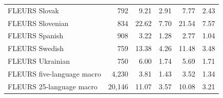 \begin{table}[!ht]
\begin{tabular}{lrrrrr}
FLEURS Slovak & 792 & 9.21 & 2.91 & 7.77 & 2.43\\
FLEURS Slovenian & 834 & 22.62 & 7.70 & 21.54 & 7.57\\
FLEURS Spanish & 908 & 3.22 & 1.28 & 2.77 & 1.04\\
FLEURS Swedish & 759 & 13.38 & 4.26 & 11.48 & 3.48\\
FLEURS Ukrainian & 750 & 6.00 & 1.74 & 5.69 & 1.71\\
\midrule
FLEURS five-language macro & 4,230 & 3.81 & 1.43 & 3.52 & 1.34\\
FLEURS 25-language macro & 20,146 & 11.07 & 3.57 & 10.08 & 3.21\\
\bottomrule
\end{tabular}
\end{table}
